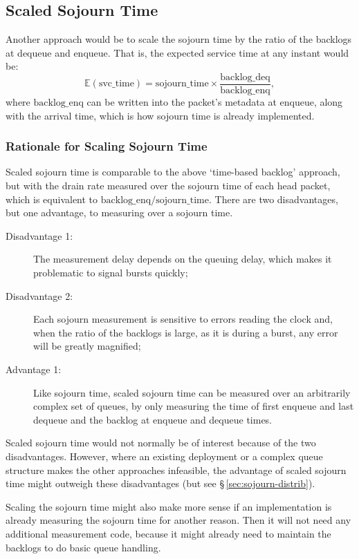 \subsection{Scaled Sojourn Time}\label{sec:scaled_svc_time}

Another approach would be to scale the sojourn time by the ratio of the backlogs at dequeue and enqueue. That is, the expected service time at any instant would be:
\[\mathbb{E}(\mathrm{svc\_time}) = \mathrm{sojourn\_time} \times \frac{\mathrm{backlog\_deq}}{\mathrm{backlog\_enq}},\]
where \(\mathrm{backlog\_enq}\) can be written into the packet's metadata at enqueue, along with the arrival time, which is how sojourn time is already implemented.

\subsubsection{Rationale for Scaling Sojourn Time}\label{sec:inst_svc_time_justify}

Scaled sojourn time is comparable to the above `time-based backlog' approach, but with the drain rate measured over the sojourn time of each head packet, which is equivalent to \(\mathrm{backlog\_enq}/\mathrm{sojourn\_time}\). There are two disadvantages, but one advantage, to measuring over a sojourn time.
\begin{description}
	\item[Disadvantage 1:] The measurement delay depends on the queuing delay, which makes it problematic to signal bursts quickly;
	\item[Disadvantage 2:] Each sojourn measurement is sensitive to errors reading the clock and, when the ratio of the backlogs is large, as it is during a burst, any error will be greatly magnified;
	\item[Advantage 1:] Like sojourn time, scaled sojourn time can be measured over an arbitrarily complex set of queues, by only measuring the time of first enqueue and last dequeue and the backlog at enqueue and dequeue times.
\end{description}

Scaled sojourn time would not normally be of interest because of the two disadvantages. However, where an existing deployment or a complex queue structure makes the other approaches infeasible, the advantage of scaled sojourn time might outweigh these disadvantages (but see \S\,\ref{sec:sojourn-distrib}).

Scaling the sojourn time might also make more sense if an implementation is already measuring the sojourn time for another reason. Then it will not need any additional measurement code, because it might already need to maintain the backlogs to do basic queue handling.

